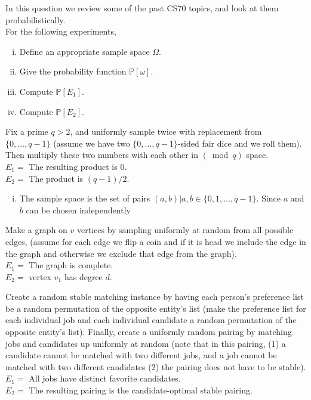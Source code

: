 \documentclass[11pt]{article}
\begin{document}
\pagebreak
{}
In this question we review some of the past CS70 topics, and look at them probabilistically.\\
For the following experiments,
\begin{enumerate}[i.]
\item Define an appropriate sample space $\Omega$.
\item Give the probability function $\mathbb P[\omega]$.
\item Compute $\mathbb P[E_1]$.
\item Compute $\mathbb P[E_2]$.
\end{enumerate}
\begin{Parts}
    \Part Fix a prime $q>2$, and uniformly sample twice with replacement from
    $\{0, \dots, q-1\}$ (assume we have two $\{0, \dots, q-1\}$-sided fair dice and we roll them). Then multiply these two numbers with each other in
    $(\bmod{q})$ space.\\
    $E_1 =$ The resulting product is $0$.\\
    $E_2 =$ The product is $(q-1)/2$.

    \begin{solution}
      \begin{enumerate}[i.]
        \item The sample space is the set of pairs $(a, b) | a, b \in \{0, 1, \dots, q-1\}$. Since $a$ and $b$ can be chosen independently 
      \end{enumerate}
    \end{solution}

    \Part Make a graph on $v$ vertices by sampling uniformly at random from all possible edges, (assume for each edge we flip a coin and if it is head we include the edge in the graph and otherwise we exclude that edge from the graph).\\
    $E_1 =$ The graph is complete.\\
    $E_2 =$ vertex $v_1$ has degree $d$.

    \Part Create a random stable matching instance by having each person's
    preference list be a random permutation of the opposite entity's list (make the preference list for each individual job and each individual candidate a random permutation of the opposite entity's list). Finally, create a uniformly random pairing by matching jobs and candidates up uniformly at random (note that in this pairing, (1) a candidate cannot be matched with two different jobs, and a job cannot be matched with two different candidates (2) the pairing does not have to be stable).\\
     $E_1 =$ All jobs have distinct favorite candidates.\\
     $E_2 =$ The resulting pairing is the candidate-optimal stable pairing.



\end{Parts}
\end{document}
